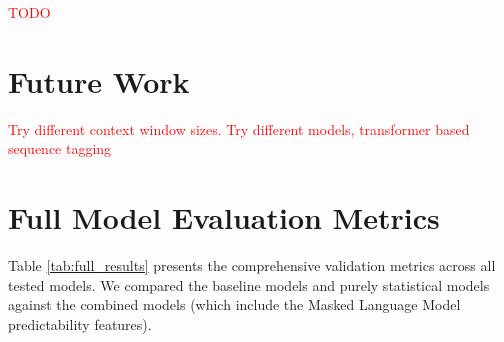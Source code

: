 \documentclass[11pt]{article}
\begin{document}
\textcolor{red}{TODO}

\section{Future Work}

\textcolor{red}{Try different context window sizes. Try different models, transformer based sequence tagging}



\newpage

\appendix

\section{Full Model Evaluation Metrics}
\label{sec:appendix_metrics}

Table \ref{tab:full_results} presents the comprehensive validation metrics across all tested models. We compared the baseline models and purely statistical models against the combined models (which include the Masked Language Model predictability features).
\end{document}
